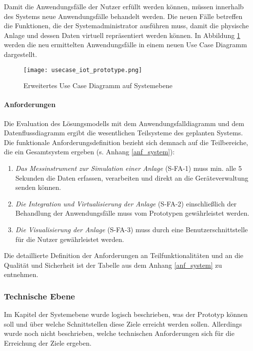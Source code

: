Damit die Anwendungsfälle der Nutzer erfüllt werden können, müssen innerhalb des Systems neue Anwendungsfälle behandelt werden. Die neuen Fälle betreffen die Funktionen, die der Systemadministrator ausführen muss, damit die physische Anlage und dessen Daten virtuell repräsentiert werden können. In Abbildung \ref{usecasediagram} werden die neu ermittelten Anwendungsfälle in einem neuen Use Case Diagramm dargestellt.

\begin{figure}[ht!]
  \centering
  \texttt{[image: usecase\_iot\_prototype.png]}
  \caption[Erweitertes Use Case Diagramm auf Systemebene]{Erweitertes Use Case Diagramm auf Systemebene}
  \label{usecasediagram}
\end{figure}
\paragraph{Anforderungen}

Die Evaluation des Lösungsmodells mit dem Anwendungsfalldiagramm und dem Datenflussdiagramm ergibt die wesentlichen Teilsysteme des geplanten Systems. Die funktionale Anforderungsdefinition bezieht sich demnach auf die Teilbereiche, die ein Gesamtsystem ergeben (s. Anhang \ref{anf_system}):
\begin{enumerate}
  \item \textit{Das Messinstrument zur Simulation einer Anlage} (S-FA-1) muss min. alle 5 Sekunden die Daten erfassen, verarbeiten und direkt an die Geräteverwaltung senden können.
  \item \textit{Die Integration und Virtualisierung der Anlage} (S-FA-2) einschließlich der Behandlung der Anwendungsfälle muss vom Prototypen gewährleistet werden.
  \item \textit{Die Visualisierung der Anlage} (S-FA-3) muss durch eine Benutzerschnittstelle für die Nutzer gewährleistet werden.
\end{enumerate}

\noindent Die detaillierte Definition der Anforderungen an Teilfunktionalitäten und an die Qualität und Sicherheit ist der Tabelle aus dem Anhang \ref{anf_system} zu entnehmen.

\subsubsection{Technische Ebene}
Im Kapitel der Systemebene wurde logisch beschrieben, was der Prototyp können soll und über welche Schnittstellen diese Ziele erreicht werden sollen. Allerdings wurde noch nicht beschrieben, welche technischen Anforderungen sich für die Erreichung der Ziele ergeben.

